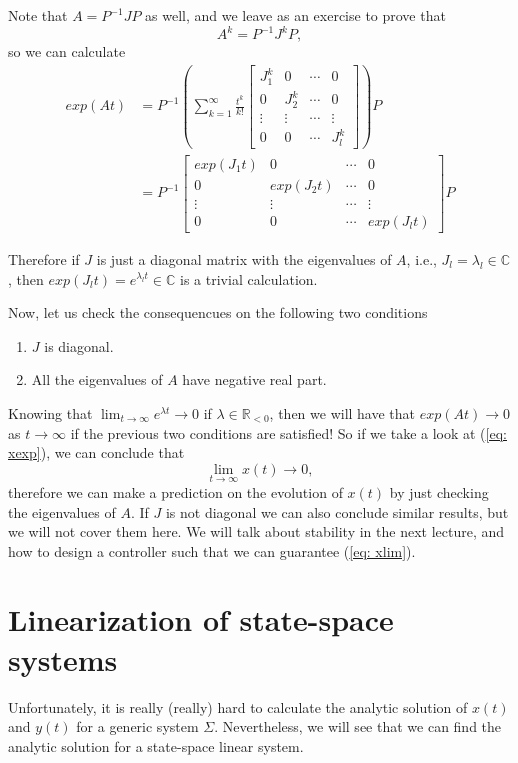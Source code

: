 Note that $A = P^{-1}JP$ as well, and we leave as an exercise to prove that
\begin{equation}
	A^k = P^{-1} J^k P,
\end{equation}
so we can calculate
\begin{align}
	exp(At) &= P^{-1}\left(\sum_{k=1}^\infty \frac{t^k}{k!} \begin{bmatrix}J_1^k & 0 & \cdots & 0 \\ 0 & J_2^k & \cdots & 0 \\ \vdots & \vdots & \cdots & \vdots \\ 0 & 0 & \cdots & J_l^k \end{bmatrix} \right) P \nonumber \\
		&= P^{-1} \begin{bmatrix}exp(J_1t) & 0 & \cdots & 0 \\ 0 & exp(J_2t) & \cdots & 0 \\ \vdots & \vdots & \cdots & \vdots \\ 0 & 0 & \cdots & exp(J_lt) \end{bmatrix} P
\end{align}


Therefore if $J$ is just a diagonal matrix with the eigenvalues of $A$, i.e., $J_l = \lambda_l \in \mathbb{C}$, then $exp(J_lt) = e^{\lambda_lt} \in\mathbb{C}$ is a trivial calculation.

Now, let us check the consequencues on the following two conditions
\begin{enumerate}
	\item $J$ is diagonal.
	\item All the eigenvalues of $A$ have negative real part.
\end{enumerate}

Knowing that $\lim_{t\to\infty} e^{\lambda t} \to 0$ if $\lambda \in \mathbb{R}_{<0}$, then we will have that $exp(At) \to 0$ as $t\to\infty$ if the previous two conditions are satisfied! So if we take a look at (\ref{eq: xexp}), we can conclude that
\begin{equation}
	\lim_{t\to\infty} x(t) \to 0,
	\label{eq: xlim}
\end{equation}
therefore we can make a prediction on the evolution of $x(t)$ by just checking the eigenvalues of $A$. If $J$ is not diagonal we can also conclude similar results, but we will not cover them here. We will talk about stability in the next lecture, and how to design a controller such that we can guarantee (\ref{eq: xlim}).

\section{Linearization of state-space systems}
Unfortunately, it is really (really) hard to calculate the analytic solution of $x(t)$ and $y(t)$ for a generic system $\Sigma$. Nevertheless, we will see that we can find the analytic solution for a state-space linear system.


